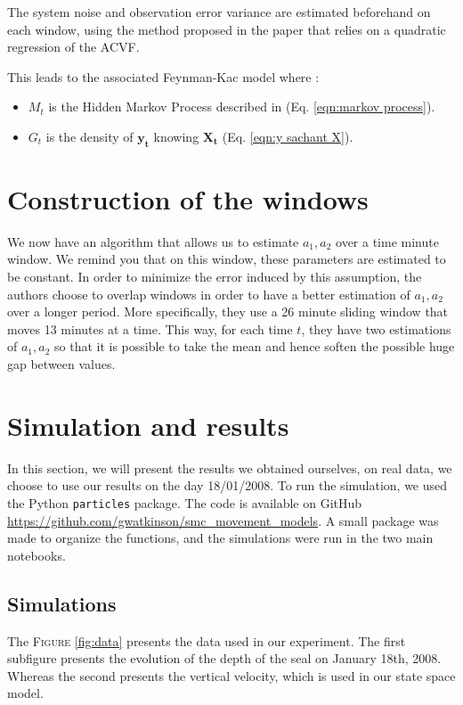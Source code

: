 The system noise and observation error variance are estimated beforehand on each window, using the method proposed in the paper that relies on a quadratic regression of the ACVF.

This leads to the associated Feynman-Kac model where :
\begin{itemize}
    \item $M_t$ is the Hidden Markov Process described in (Eq. \ref{eqn:markov process}).
    \item $G_t$ is the density of $\mathbf{y_t}$ knowing $\mathbf{X_t}$ (Eq. \ref{eqn:y sachant X}).
\end{itemize}

\section{Construction of the windows}
We now have an algorithm that allows us to estimate $a_1, a_2$ over a time minute window. We remind you that on this window, these parameters are estimated to be constant. In order to minimize the error induced by this assumption, the authors choose to overlap windows in order to have a better estimation of $a_1, a_2$ over a longer period. More specifically, they use a 26 minute sliding window that moves 13 minutes at a time. This way, for each time $t$, they have two estimations of $a_1, a_2$ so that it is possible to take the mean and hence soften the possible huge gap between values.


\section{Simulation and results}
In this section, we will present the results we obtained ourselves, on real data, we choose to use our results on the day 18/01/2008. To run the simulation, we used the Python \texttt{particles} package. The code is available on GitHub \url{https://github.com/gwatkinson/smc_movement_models}. A small package was made to organize the functions, and the simulations were run in the two main notebooks.

\subsection{Simulations}
The \textsc{Figure} \ref{fig:data} presents the data used in our experiment. The first subfigure presents the evolution of the depth of the seal on January 18th, 2008. Whereas the second presents the vertical velocity, which is used in our state space model.

